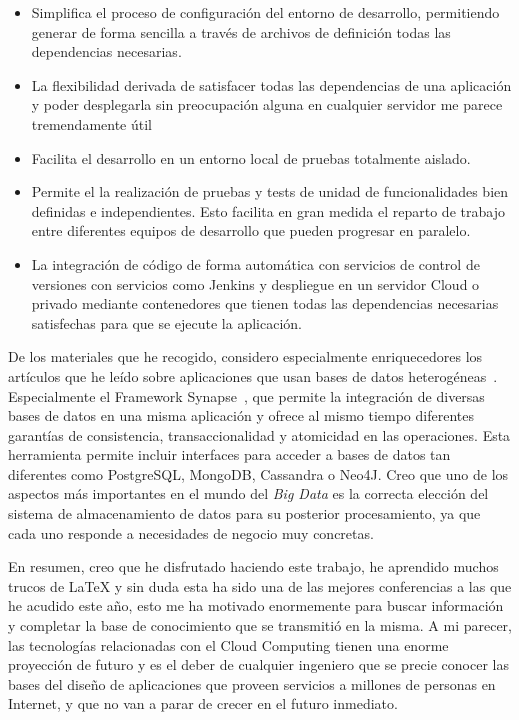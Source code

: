 \begin{itemize}
\item Simplifica el proceso de configuración del entorno de desarrollo, permitiendo generar de forma sencilla a través de archivos de definición todas las dependencias necesarias.
\item La flexibilidad derivada de satisfacer todas las dependencias de una aplicación y poder desplegarla sin preocupación alguna en cualquier servidor me parece tremendamente útil
\item Facilita el desarrollo en un entorno local de pruebas totalmente aislado.
\item Permite el la realización de pruebas y tests de unidad de funcionalidades bien definidas e independientes. Esto facilita en gran medida el reparto de trabajo entre diferentes equipos de desarrollo que pueden progresar en paralelo.
\item La integración de código de forma automática con servicios de control de versiones con servicios como Jenkins y despliegue en un servidor Cloud o privado mediante contenedores que tienen todas las dependencias necesarias satisfechas para que se ejecute la aplicación.
\end{itemize}

De los materiales que he recogido, considero especialmente enriquecedores los artículos que he leído sobre aplicaciones que usan bases de datos heterogéneas~\cite{poly}. Especialmente el Framework Synapse~\cite{synapse}, que permite la integración de diversas bases de datos en una misma aplicación y ofrece al mismo tiempo diferentes garantías de consistencia, transaccionalidad y atomicidad en las operaciones. Esta herramienta permite incluir interfaces para acceder a bases de datos tan diferentes como PostgreSQL, MongoDB, Cassandra o Neo4J. Creo que uno de los aspectos más importantes en el mundo del \emph{Big Data} es la correcta elección del sistema de almacenamiento de datos para su posterior procesamiento, ya que cada uno responde a necesidades de negocio muy concretas.

En resumen, creo que he disfrutado haciendo este trabajo, he aprendido muchos trucos de LaTeX y sin duda esta ha sido una de las mejores conferencias a las que he acudido este año, esto me ha motivado enormemente para buscar información y completar la base de conocimiento que se transmitió en la misma. A mi parecer, las tecnologías relacionadas con el Cloud Computing tienen una enorme proyección de futuro y es el deber de cualquier ingeniero que se precie conocer las bases del diseño de aplicaciones que proveen servicios a millones de personas en Internet, y que no van a parar de crecer en el futuro inmediato. 

